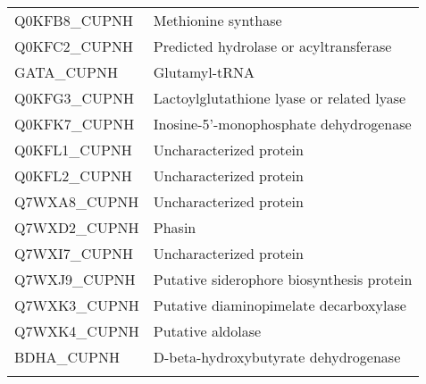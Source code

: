 \begin{center}
\begin{longtable}{ l l }
Q0KFB8\_CUPNH & Methionine synthase \\ [0.5ex]
Q0KFC2\_CUPNH & Predicted hydrolase or acyltransferase \\ [0.5ex]
GATA\_CUPNH & Glutamyl-tRNA \\ [0.5ex]
Q0KFG3\_CUPNH & Lactoylglutathione lyase or related lyase \\ [0.5ex]
Q0KFK7\_CUPNH & Inosine-5'-monophosphate dehydrogenase \\ [0.5ex]
Q0KFL1\_CUPNH & Uncharacterized protein \\ [0.5ex]
Q0KFL2\_CUPNH & Uncharacterized protein \\ [0.5ex]
Q7WXA8\_CUPNH & Uncharacterized protein \\ [0.5ex]
Q7WXD2\_CUPNH & Phasin \\ [0.5ex]
Q7WXI7\_CUPNH & Uncharacterized protein \\ [0.5ex]
Q7WXJ9\_CUPNH & Putative siderophore biosynthesis protein \\ [0.5ex]
Q7WXK3\_CUPNH & Putative diaminopimelate decarboxylase \\ [0.5ex]
Q7WXK4\_CUPNH & Putative aldolase \\ [0.5ex]
BDHA\_CUPNH & D-beta-hydroxybutyrate dehydrogenase \\ [0.5ex] \bottomrule
\label{table:ralstonia-proteins}
\end{longtable}
\end{center}
